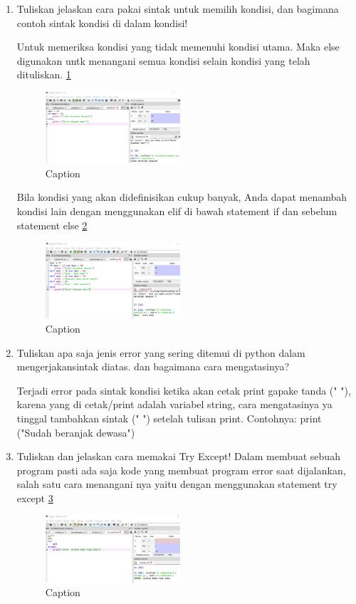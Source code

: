 \begin{enumerate}
        \item  Tuliskan jelaskan cara pakai sintak untuk memilih kondisi, dan bagimana contoh sintak kondisi di dalam kondisi!
        \par
        Untuk memeriksa kondisi yang tidak memenuhi kondisi utama. Maka else digunakan untk menangani semua kondisi selain kondisi yang telah dituliskan. \ref{capture25}
        \begin{figure} [htbp!]
            \centering
            \includegraphics[width=5cm]{figures/Capture25.PNG}
            \caption{Caption}
            \label{capture25}
        \end{figure}
        \par
        Bila kondisi yang akan didefinisikan cukup banyak, Anda dapat menambah kondisi lain dengan menggunakan elif di bawah statement if dan sebelum statement else \ref{capture26}
         \begin{figure} [htbp!]
            \centering
            \includegraphics[width=5cm]{figures/Capture26.PNG}
            \caption{Caption}
            \label{capture26}
        \end{figure}
      
        \item Tuliskan apa saja jenis error yang sering ditemui di python dalam mengerjakansintak diatas.  dan bagaimana cara mengatasinya?
        \par
        Terjadi error pada sintak kondisi ketika akan cetak print gapake tanda (" "), karena yang di cetak/print adalah variabel string, cara mengatasinya ya tinggal tambahkan sintak (" ") setelah tulisan print. Contohnya: print ("Sudah beranjak dewasa")
        
        \item Tuliskan dan jelaskan cara memakai Try Except!
        Dalam membuat sebuah program pasti ada saja kode yang membuat program error saat dijalankan, salah satu cara menangani nya yaitu dengan menggunakan statement try except \ref{capture27}
        \begin{figure} [htbp!]
            \centering
            \includegraphics[width=5cm]{figures/Capture27.PNG}
            \caption{Caption}
            \label{capture27}
        \end{figure}
        
\end{enumerate}



